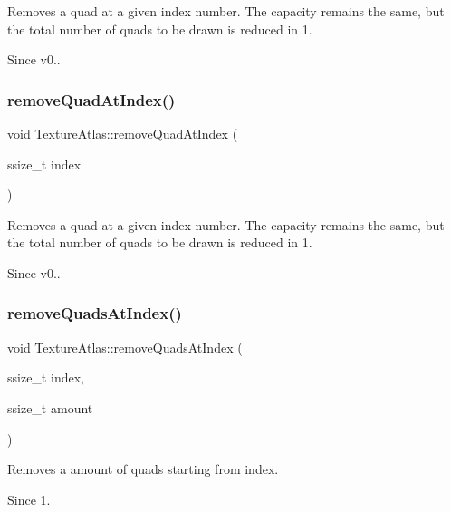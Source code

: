 Removes a quad at a given index number. The capacity remains the same, but the total number of quads to be drawn is reduced in 1. \begin{DoxySince}{Since}
v0.. 
\end{DoxySince}
\mbox{\label{classTextureAtlas_a67ab93a008f52e7d204ae8a402f71a9b}} 
\subsubsection{\texorpdfstring{remove\+Quad\+At\+Index()}{removeQuadAtIndex()}\hspace{0.1cm}{\footnotesize\ttfamily [2/2]}}
{\footnotesize\ttfamily void Texture\+Atlas\+::remove\+Quad\+At\+Index (\begin{DoxyParamCaption}\item[{ssize\+\_\+t}]{index }\end{DoxyParamCaption})}

Removes a quad at a given index number. The capacity remains the same, but the total number of quads to be drawn is reduced in 1. \begin{DoxySince}{Since}
v0.. 
\end{DoxySince}
\mbox{\label{classTextureAtlas_ab1c31f38025e77b95050fd798bd76919}} 
\subsubsection{\texorpdfstring{remove\+Quads\+At\+Index()}{removeQuadsAtIndex()}\hspace{0.1cm}{\footnotesize\ttfamily [1/2]}}
{\footnotesize\ttfamily void Texture\+Atlas\+::remove\+Quads\+At\+Index (\begin{DoxyParamCaption}\item[{ssize\+\_\+t}]{index,  }\item[{ssize\+\_\+t}]{amount }\end{DoxyParamCaption})}

Removes a amount of quads starting from index. \begin{DoxySince}{Since}
1. 
\end{DoxySince}
\mbox{\label{classTextureAtlas_ab1c31f38025e77b95050fd798bd76919}} 
